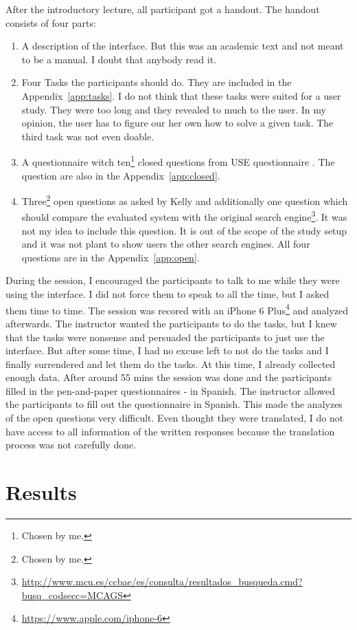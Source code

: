 \documentclass[11pt]{report}
\begin{document}
	After the introductory lecture, all participant got a handout. The handout consists of four parts:
\begin{enumerate}
	\item A description of the interface. But this was an academic text and not meant to be a manual. I doubt that anybody read it.
	\item Four Tasks the participants should do. They are included in the Appendix~\ref{app:tasks}. I do not think that these tasks were suited for a user study. They were too long and they revealed to much to the user. In my opinion, the user has to figure our her own how to solve a given task. The third task was not even doable.
	\item A questionnaire witch ten\footnote{Chosen by me.} closed questions from USE questionnaire \cite{lund2001measuring}. The question are also in the Appendix~\ref{app:closed}.
	\item Three\footnote{Chosen by me.} open questions as asked by Kelly \cite{Kelly2008} and additionally one question which should compare the evaluated system with the original search engine\footnote{\url{http://www.mcu.es/ccbae/es/consulta/resultados_busqueda.cmd?busq_codsecc=MCAGS}}. It was not my idea to include this question. It is out of the scope of the study setup and it was not plant to show users the other search engines. All four questions are in the Appendix~\ref{app:open}.
\end{enumerate}

During the session, I encouraged the participants to talk to me while they were using the interface. I did not force them to speak to all the time, but I asked them time to time. The session was recored with an iPhone 6 Plus\footnote{\url{https://www.apple.com/iphone-6}} and analyzed afterwards. The instructor wanted the participants to do the tasks, but I knew that the tasks were nonsense and persuaded the participants to just use the interface. But after some time, I had no excuse left to not do the tasks and I finally surrendered and let them do the tasks. At this time, I already collected enough data. After around 55 mins the session was done and the participants filled in the pen-and-paper questionnaires - in Spanish. The instructor allowed the participants to fill out the questionnaire in Spanish. This made the analyzes of the open questions very difficult. Even thought they were translated, I do not have access to all information of the written responses because the translation process was not carefully done.
\section{Results}
\end{document}
